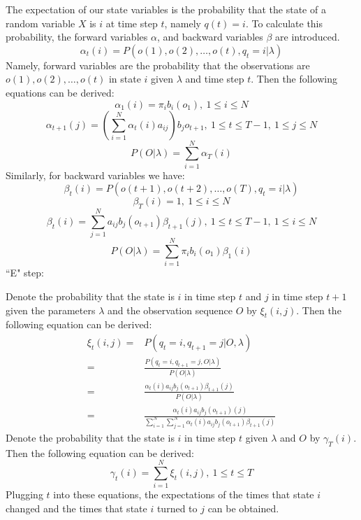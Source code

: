 \documentclass[conference]{IEEEtran}
\begin{document}
The expectation of our state variables is the probability that the state of a random variable $X$ is $i$ at time step $t$, namely $q(t)=i$. To calculate this probability, the forward variables $\alpha$, and backward variables $\beta$ are introduced.
\begin{equation}
\alpha_t(i)=P(o(1),o(2),\dots,o(t),q_t=i|\lambda)
\end{equation}
Namely, forward variables are the probability that the observations are $o(1),o(2),\dots,o(t)$ in state $i$ given $\lambda$ and time step $t$. Then the following equations can be derived:
\begin{equation}
\alpha_1(i)=\pi_ib_i(o_1),\ 1\leq i\leq N
\end{equation}
\begin{equation}
\alpha_{t+1}(j)=(\sum_{i=1}^N\alpha_t(i)a_{ij})b_jo_{t+1}, \ 1\leq t\leq T-1,\ 1\leq j\leq N
\end{equation}
\begin{equation}
P(O|\lambda)=\sum_{i=1}^N\alpha_T(i)
\end{equation}
Similarly, for backward variables we have:
\begin{equation}
\beta_t(i)=P(o(t+1),o(t+2),\dots,o(T),q_t=i|\lambda)
\end{equation}
\begin{equation}
\beta_T(i)=1,\ 1\leq i\leq N
\end{equation}
\begin{equation}
\beta_t(i)=\sum_{j=1}^Na_{ij}b_j(o_{t+1})\beta_{t+1}(j),\ 1\leq t\leq T-1,\ 1\leq i\leq N
\end{equation}
\begin{equation}
P(O|\lambda)=\sum_{i=1}^N\pi_ib_i(o_1)\beta_1(i)
\end{equation}
``E" step:

Denote the probability that the state is $i$ in time step $t$ and $j$ in time step $t+1$ given the parameters $\lambda$ and the observation sequence $O$ by $\xi_t(i,j)$. Then the following equation can be derived:
\begin{equation}
\begin{array}{rl}
\xi_t(i,j)=&P(q_t=i,q_{t+1}=j|O,\lambda)\\
=&\frac{P(q_t=i,q_{t+1}=j,O|\lambda)}{P(O|\lambda)}\\
=&\frac{\alpha_t(i)a_{ij}b_j(o_{t+1})\beta_{t+1}(j)}{P(O|\lambda)}\\
=&\frac{\alpha_t(i)a_{ij}b_j(o_{t+1})(j)}{\sum_{i=1}^N\sum_{j=1}^N\alpha_t(i)a_{ij}b_j(o_{t+1})\beta_{t+1}(j)}
\end{array}
\end{equation}
Denote the probability that the state is $i$ in time step $t$ given $\lambda$ and $O$ by $\gamma_T(i)$. Then the following equation can be derived:
\begin{equation}
\gamma_t(i)=\sum_{i=1}^N\xi_t(i,j),\ 1\leq t\leq T
\end{equation}
Plugging $t$ into these equations, the expectations of the times that state $i$ changed and the times that state $i$ turned to $j$ can be obtained.\\
\end{document}

